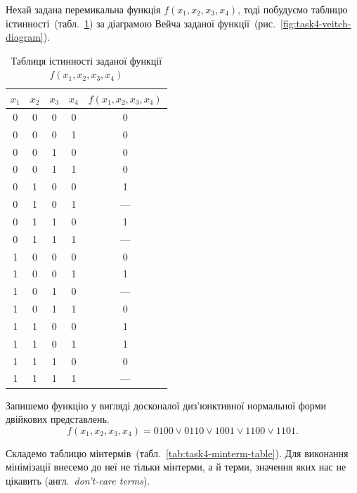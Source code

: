 \documentclass[a4paper,oneside,DIV=12,12pt]{scrartcl}
\newcommand{\langdef}[2]{#1~\textit{#2}}
\begin{document}
	\begin{solution}
		Нехай задана перемикальна функція $f(x_1, x_2, x_3, x_4)$, тоді побудуємо таблицю істинності~(табл.~\ref{tab:task4-function-truth-table}) за діаграмою Вейча заданої функції~(рис.~\ref{fig:task4-veitch-diagram}).
		
		\begin{table}[!htbp]
		\centering
			\begin{tabular}{ccccc}
				\toprule
					$x_1$ & $x_2$ & $x_3$ & $x_4$ & $f(x_1, x_2, x_3, x_4)$ \\
				\midrule
					0     & 0     & 0     & 0     & 0 \\
					0     & 0     & 0     & 1     & 0 \\
					0     & 0     & 1     & 0     & 0 \\
					0     & 0     & 1     & 1     & 0 \\
					0     & 1     & 0     & 0     & 1 \\
					0     & 1     & 0     & 1     & — \\
					0     & 1     & 1     & 0     & 1 \\
					0     & 1     & 1     & 1     & — \\
					1     & 0     & 0     & 0     & 0 \\
					1     & 0     & 0     & 1     & 1 \\
					1     & 0     & 1     & 0     & — \\
					1     & 0     & 1     & 1     & 0 \\
					1     & 1     & 0     & 0     & 1 \\
					1     & 1     & 0     & 1     & 1 \\
					1     & 1     & 1     & 0     & 0 \\
					1     & 1     & 1     & 1     & — \\
				\bottomrule
			\end{tabular}
		\caption{Таблиця істинності заданої функції $f(x_1, x_2, x_3, x_4)$}
		\label{tab:task4-function-truth-table}
		\end{table}
		
		Запишемо функцію у вигляді досконалої диз'\-юн\-ктив\-ної нормальної форми двійкових представлень.
		\[
			f(x_1, x_2, x_3, x_4) = 0100 \lor 0110 \lor 1001 \lor 1100 \lor 1101.
		\]
		
		Складемо таблицю мінтермів~(табл.~\ref{tab:task4-minterm-table}). Для виконання мінімізації внесемо до неї не тільки мінтерми, а й терми, значення яких нас не цікавить (\langdef{англ.}{don't-care terms}).
		

\end{solution}
\end{document}
